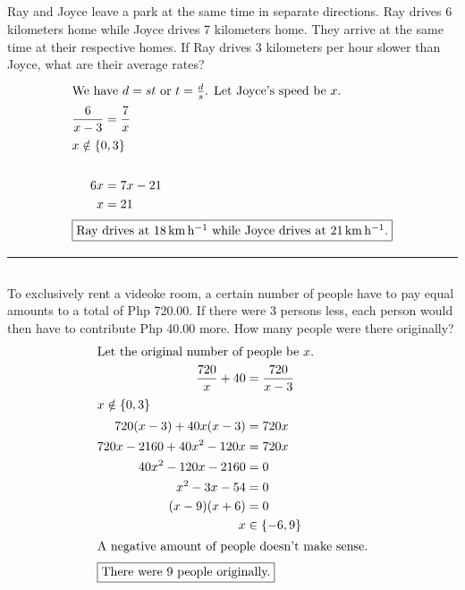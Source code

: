 	\subsection{}
		Ray and Joyce leave a park at the same time in separate directions. Ray drives
		6 kilometers home while Joyce drives 7 kilometers home. They arrive at the same
		time at their respective homes. If Ray drives 3 kilometers per hour slower than
		Joyce, what are their average rates?
		\begin{align*}
			\intertext{We have $d = st$ or $t = \frac{d}{s}$. Let Joyce's speed be $x$.}
			\frac{6}{x - 3} &= \frac{7}{x} \\
			\intertext{$x \notin \{0, 3\}$} \\
			6x &= 7x - 21 \\
			x &= 21 \\
			\intertext{\centering\fbox{Ray drives at \qty{18}{\kilo\meter\per\hour} while Joyce drives at \qty{21}{\kilo\meter\per\hour}.}}
		\end{align*}
		\hrule{}

	\subsection{}
		To exclusively rent a videoke room, a certain number of people have to pay equal
		amounts to a total of Php 720.00. If there were 3 persons less, each person would
		then have to contribute Php 40.00 more. How many people were there originally?
		\begin{align*}
			\intertext{Let the original number of people be $x$.}
			\frac{720}{x} + 40 &= \frac{720}{x - 3} \\
			\intertext{$x \notin \{0, 3\}$}
			720(x - 3) + 40x(x - 3) &= 720x \\
			720x - 2160 + 40x^2 - 120x &= 720x \\
			40x^2 - 120x - 2160 &= 0 \\
			x^2 - 3x - 54 &= 0 \\
			(x - 9)(x + 6) &= 0 \\
			x &\in \{-6, 9\} \\
			\intertext{A negative amount of people doesn't make sense.}
			\intertext{\centering\fbox{There were 9 people originally.}}
		\end{align*}
		\pagebreak{}


